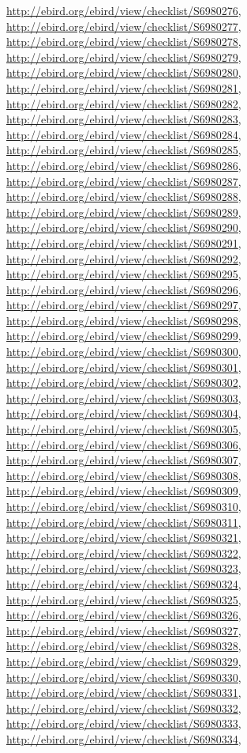 \documentclass[9pt, article]{memoir}
\begin{document}
\begin{multicols}{2}
\url{http://ebird.org/ebird/view/checklist/S6980276}, 
\url{http://ebird.org/ebird/view/checklist/S6980277}, 
\url{http://ebird.org/ebird/view/checklist/S6980278}, 
\url{http://ebird.org/ebird/view/checklist/S6980279}, 
\url{http://ebird.org/ebird/view/checklist/S6980280}, 
\url{http://ebird.org/ebird/view/checklist/S6980281}, 
\url{http://ebird.org/ebird/view/checklist/S6980282}, 
\url{http://ebird.org/ebird/view/checklist/S6980283}, 
\url{http://ebird.org/ebird/view/checklist/S6980284}, 
\url{http://ebird.org/ebird/view/checklist/S6980285}, 
\url{http://ebird.org/ebird/view/checklist/S6980286}, 
\url{http://ebird.org/ebird/view/checklist/S6980287}, 
\url{http://ebird.org/ebird/view/checklist/S6980288}, 
\url{http://ebird.org/ebird/view/checklist/S6980289}, 
\url{http://ebird.org/ebird/view/checklist/S6980290}, 
\url{http://ebird.org/ebird/view/checklist/S6980291}, 
\url{http://ebird.org/ebird/view/checklist/S6980292}, 
\url{http://ebird.org/ebird/view/checklist/S6980295}, 
\url{http://ebird.org/ebird/view/checklist/S6980296}, 
\url{http://ebird.org/ebird/view/checklist/S6980297}, 
\url{http://ebird.org/ebird/view/checklist/S6980298}, 
\url{http://ebird.org/ebird/view/checklist/S6980299}, 
\url{http://ebird.org/ebird/view/checklist/S6980300}, 
\url{http://ebird.org/ebird/view/checklist/S6980301}, 
\url{http://ebird.org/ebird/view/checklist/S6980302}, 
\url{http://ebird.org/ebird/view/checklist/S6980303}, 
\url{http://ebird.org/ebird/view/checklist/S6980304}, 
\url{http://ebird.org/ebird/view/checklist/S6980305}, 
\url{http://ebird.org/ebird/view/checklist/S6980306}, 
\url{http://ebird.org/ebird/view/checklist/S6980307}, 
\url{http://ebird.org/ebird/view/checklist/S6980308}, 
\url{http://ebird.org/ebird/view/checklist/S6980309}, 
\url{http://ebird.org/ebird/view/checklist/S6980310}, 
\url{http://ebird.org/ebird/view/checklist/S6980311}, 
\url{http://ebird.org/ebird/view/checklist/S6980321}, 
\url{http://ebird.org/ebird/view/checklist/S6980322}, 
\url{http://ebird.org/ebird/view/checklist/S6980323}, 
\url{http://ebird.org/ebird/view/checklist/S6980324}, 
\url{http://ebird.org/ebird/view/checklist/S6980325}, 
\url{http://ebird.org/ebird/view/checklist/S6980326}, 
\url{http://ebird.org/ebird/view/checklist/S6980327}, 
\url{http://ebird.org/ebird/view/checklist/S6980328}, 
\url{http://ebird.org/ebird/view/checklist/S6980329}, 
\url{http://ebird.org/ebird/view/checklist/S6980330}, 
\url{http://ebird.org/ebird/view/checklist/S6980331}, 
\url{http://ebird.org/ebird/view/checklist/S6980332}, 
\url{http://ebird.org/ebird/view/checklist/S6980333}, 
\url{http://ebird.org/ebird/view/checklist/S6980334}, 

\end{multicols}
\end{document}
